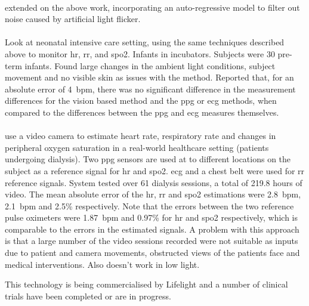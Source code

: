 \documentclass[11pt, parskip=half*,twoside=false]{scrbook}
\begin{document}
\paragraph{\citet{tarassenkoNoncontactVideobasedVital2014}} extended on the above work, incorporating an auto-regressive model to filter out noise caused by artificial light flicker. 

\paragraph{\citet{villarroelContinuousNoncontactVital2014}} Look at neonatal intensive care setting, using the same techniques described above to monitor \gls{hr}, \gls{rr}, and \gls{spo2}. Infants in incubators. Subjects were 30 pre-term infants. Found large changes in the ambient light conditions, subject movement and no visible skin as issues with the method. Reported that, for an absolute error of 4~\gls{bpm}, there was no significant difference in the measurement differences for the vision based method and the \gls{ppg} or \gls{ecg} methods, when compared to the differences between the \gls{ppg} and \gls{ecg} measures themselves.

\paragraph{\citet{villarroelNonContactVitalSign2017}} use a video camera to estimate heart rate, respiratory rate and changes in peripheral oxygen saturation in a real-world healthcare setting (patients undergoing dialysis). Two \gls{ppg} sensors are used at to different locations on the subject as a reference signal for \gls{hr} and \gls{spo2}. \gls{ecg} and a chest belt were used for \gls{rr} reference signals. System tested over 61 dialysis sessions, a total of 219.8 hours of video. The mean absolute error of the \gls{hr}, \gls{rr} and \gls{spo2} estimations were 2.8~\gls{bpm}, 2.1~\gls{bpm} and 2.5\% respectively. Note that the errors between the two reference pulse oximeters were 1.87~\gls{bpm} and 0.97\% for \gls{hr} and \gls{spo2} respectively, which is comparable to the errors in the estimated signals.  A problem with this approach is that a large number of the video sessions recorded were not suitable as inputs due to patient and camera movements, obstructed views of the patients face and medical interventions. Also doesn't work in low light.

This technology is being commercialised by Lifelight \citep{suzanneLifelightXimLimited} and a number of clinical trials have been completed or are in progress. 
\end{document}
